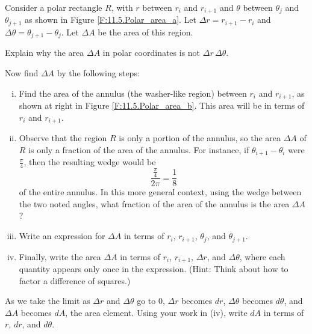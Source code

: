 \begin{activity} \label{A:11.5.3} Consider a polar rectangle $R$, with $r$ between $r_i$ and $r_{i+1}$ and $\theta$ between $\theta_j$ and $\theta_{j+1}$ as shown in Figure \ref{F:11.5.Polar_area_a}. Let $\Delta r = r_{i+1}-r_i$ and $\Delta \theta = \theta_{j+1}-\theta_j$. Let $\Delta A$ be the area of this region.
	\ba
	\item Explain why the area $\Delta A$ in polar coordinates is not $\Delta r \, \Delta \theta$.



	\item Now find $\Delta A$ by the following steps:
		\begin{enumerate}[i.]
		\item Find the area of the annulus (the washer-like region) between $r_i$ and $r_{i+1}$, as shown at right in Figure \ref{F:11.5.Polar_area_b}. This area will be in terms of $r_i$ and $r_{i+1}$.

		\item Observe that the region $R$ is only a portion of the annulus, so the area $\Delta A$ of $R$ is only a fraction of the area of the annulus.  For instance, if $\theta_{i+1} - \theta_i$ were $\frac{\pi}{4}$, then the resulting wedge would be 
		$$\frac{ \frac{\pi}{4} }{2\pi} = \frac{1}{8}$$
		of the entire annulus.  In this more general context, using the wedge between the two noted angles, what fraction of the area of the annulus is the area $\Delta A$? 

		\item Write an expression for $\Delta A$ in terms of $r_i$, $r_{i+1}$, $\theta_j$, and $\theta_{j+1}$.

		\item Finally, write the area $\Delta A$ in terms of $r_i$, $r_{i+1}$, $\Delta r$, and $\Delta \theta$, where each quantity appears only once in the expression. (Hint: Think about how to factor a difference of squares.)
	

	
		\end{enumerate}
	
	\item As we take the limit as $\Delta r$ and $\Delta \theta$ go to 0, $\Delta r$ becomes $dr$, $\Delta \theta$ becomes $d \theta$, and $\Delta A$ becomes $dA$, the area element. Using your work in (iv), write $dA$ in terms of $r$, $dr$, and $d \theta$.



	\ea

\end{activity}
